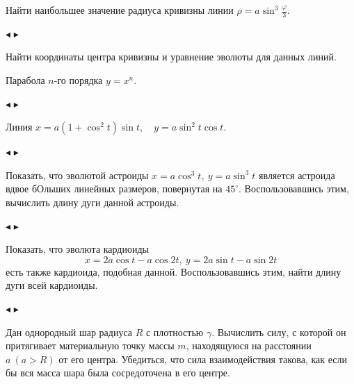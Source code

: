 \documentclass[a5paper,10pt]{article}
\begin{document}

\medskip
{} Найти наибольшее значение радиуса кривизны линии
$\displaystyle \rho=a\sin^3\frac{\varphi}{3}$.

\smallskip
\noindent $\blacktriangleleft$
$\blacktriangleright$

\medskip
\noindent Найти координаты центра кривизны и уравнение эволюты для данных линий.

\medskip
{} Парабола $n\mbox{-го}$ порядка $y=x^n$.

\smallskip
\noindent $\blacktriangleleft$
$\blacktriangleright$

\medskip
{} Линия $x=a(1+\cos^2t)\sin t,\quad y=a\sin^2t\cos t$.

\smallskip
\noindent $\blacktriangleleft$
$\blacktriangleright$

\medskip
{} Показать, что эволютой астроиды $x=a\cos^3t,\ y=a\sin^3t$
является астроида вдвое бОльших линейных размеров, повернутая
на $45^\circ$. Воспользовавшись этим, вычислить длину дуги данной астроиды.

\smallskip
\noindent $\blacktriangleleft$
$\blacktriangleright$

\medskip
{} Показать, что эволюта кардиоиды
$$x=2a\cos t-a\cos 2t,\ y=2a\sin t-a\sin 2t$$
есть также кардиоида, подобная данной. Воспользовавшись этим,
найти длину дуги всей кардиоиды.

\smallskip
\noindent $\blacktriangleleft$
$\blacktriangleright$

\medskip
{} Дан однородный шар радиуса $R$ с плотностью $\gamma$.
Вычислить силу, с которой он притягивает материальную точку массы $m$, находящуюся
на расстоянии $a\ (a>R)$ от его центра. Убедиться, что сила взаимодействия такова,
как если бы вся масса шара была сосредоточена в его центре.
\end{document}
